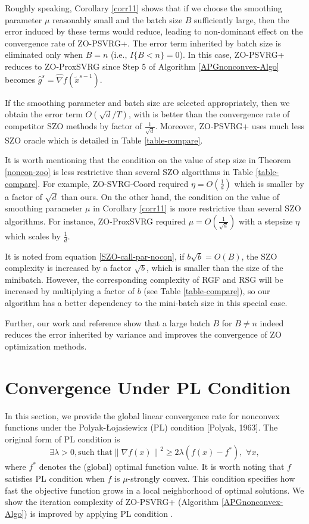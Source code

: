 \documentclass{article}
\newcommand{\norm}[1]{\left\lVert#1\right\rVert}
\theoremstyle{definition}
\theoremstyle{remark}
\begin{document}
Roughly speaking, Corollary \ref{corr11} shows  that if we choose the smoothing parameter $\mu$ reasonably small and the batch size $B$ sufficiently large, then the error induced by these terms would reduce, leading to non-dominant effect on the convergence rate of ZO-PSVRG+.
The error term inherited by batch size  is eliminated only when $B = n$  (i.e., $I\{B < n\} = 0$). In
this case, ZO-PSVRG+ reduces to ZO-ProxSVRG since Step 5 of Algorithm \ref{APGnonconvex-Algo} becomes $\hat{g}^s = \hat{\nabla} f(\widetilde{x}^{s-1})$. 

If the smoothing parameter and batch size are selected appropriately, then we obtain the error term $O(\sqrt{d}/T)$, with is better than the convergence rate of competitor SZO methods by factor of $\frac{1}{\sqrt{d}}$. Moreover, ZO-PSVRG+ uses much less SZO oracle which is detailed in Table \ref{table-compare}.

It is worth mentioning that the condition on the value of step size in Theorem \ref{noncon-zoo} is less restrictive than several SZO algorithms  in Table \ref{table-compare}. For example, ZO-SVRG-Coord required $\eta = O(\frac{1}{d})$ which is smaller by a factor of $\sqrt{d}$ than ours. {\color{Brown}On the other hand, the condition on the value of smoothing parameter $\mu$ in Corollary \ref{corr11} is more restrictive than several SZO algorithms. For instance, ZO-ProxSVRG required $\mu= O(\frac{1}{\sqrt{d}})$ with a stepsize $\eta$ which scales by $\frac{1}{d}$.}


{\color{Green}
It is noted from equation \eqref{SZO-call-par-nocon},  if ${b\sqrt{b}} = O(B)$, the SZO complexity is increased by a factor $\sqrt{b}$, which is smaller than the size of the minibatch. However, the corresponding complexity of RGF and RSG will be increased by multiplying
a factor of $b$ (see Table \ref{table-compare}), so our algorithm has a better dependency to the mini-batch size in this special case.

}
{\color{Brown}
Further, our work and reference \cite{} show that a large batch $B$  for $B \neq n$ indeed reduces the error inherited by variance and improves the convergence of ZO optimization methods.
}
\section{Convergence Under PL Condition}
{\color{Violet} In this section, we provide the global linear convergence rate for nonconvex functions under the Polyak-Łojasiewicz
(PL) condition [Polyak, 1963].}
The original form of PL condition is
\begin{equation}
\exists \lambda >0, \text{such~that} \norm{\nabla f(x)}^2 \geq 2\lambda (f(x) - f^*),\,\, \forall x,
\end{equation}
where $f^*$ denotes the (global) optimal function value. It is worth noting that $f$ satisfies PL condition when $f$ is $\mu$-strongly convex.
{\color{RubineRed}
This condition specifies how fast the objective function grows in a local neighborhood of optimal solutions.
}
{\color{Brown} We show the iteration complexity of ZO-PSVRG+ (Algorithm \ref{APGnonconvex-Algo}) is improved by applying PL condition .}
\end{document}
